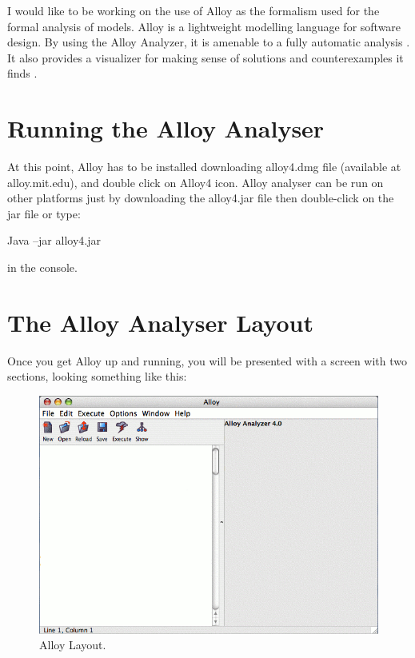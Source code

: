 \documentclass[a4paper,10pt]{report}
\begin{document}
I would like to be working on the use of Alloy as the formalism used for the formal analysis of models. Alloy is a lightweight modelling language for software design. By using the Alloy Analyzer, it is amenable to a fully automatic analysis \cite{D.Jackson}. It also provides a visualizer for making sense of solutions and counterexamples it finds \cite{P.Curson}.

\section{Running the Alloy Analyser}
\label{Run Alloy Analyzer}

At this point, Alloy has to be installed downloading alloy4.dmg file (available at alloy.mit.edu), and double click on Alloy4 icon. Alloy analyser can be run on other platforms just by downloading the alloy4.jar file then double-click on the jar file or type:

\begin{center}
Java –jar alloy4.jar
\end{center}

in the console.

\section{The Alloy Analyser Layout}
\label{Alloy Analyser layout}

Once you get Alloy up and running, you will be presented with a screen with two sections, looking something like this:

 \begin{figure}[h!]
\centering
 \includegraphics[width= 1\textwidth]{alloyblank.png}
\caption{Alloy Layout.}
 \end{figure}
 
\end{document}

